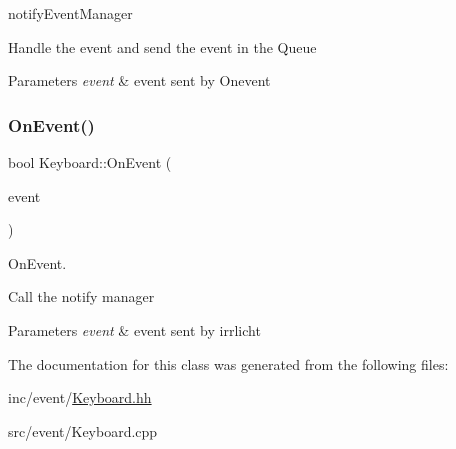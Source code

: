 notify\+Event\+Manager 

Handle the event and send the event in the Queue


\begin{DoxyParams}{Parameters}
{\em event} & event sent by Onevent \\
\hline
\end{DoxyParams}
\mbox{\label{classKeyboard_ad6974153a0c29b55c1b8765d0d6ccbfa}} 
\subsubsection{\texorpdfstring{On\+Event()}{OnEvent()}}
{\footnotesize\ttfamily bool Keyboard\+::\+On\+Event (\begin{DoxyParamCaption}\item[{const irr\+::\+S\+Event \&}]{event }\end{DoxyParamCaption})\hspace{0.3cm}{\ttfamily [virtual]}}



On\+Event. 

Call the notify manager


\begin{DoxyParams}{Parameters}
{\em event} & event sent by irrlicht \\
\hline
\end{DoxyParams}


The documentation for this class was generated from the following files\+:\begin{DoxyCompactItemize}
\item 
inc/event/\hyperlink{Keyboard_8hh}{Keyboard.\+hh}\item 
src/event/Keyboard.\+cpp\end{DoxyCompactItemize}
